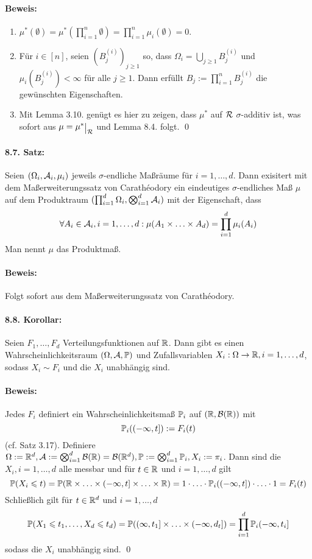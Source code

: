 \paragraph{Beweis:}
\begin{enumerate}[label=(\roman*)]
	\item $\mu^*(\emptyset)=\mu^*\left(\prod_{i=1}^n\emptyset\right)=\prod_{i=1}^n\mu_i(\emptyset)=0$.
	\item F\"ur $i\in[n]$, seien $(B_j^{(i)})_{j\geq1}$ so, dass $\Omega_i=\bigcup_{j\geq1}B_j^{(i)}$ und $\mu_i(B_j^{(i)})<\infty$ f\"ur alle $j\geq1$. Dann erf\"ullt $B_j:=\prod_{i=1}^nB_j^{(i)}$ die gew\"unschten Eigenschaften.
	\item Mit Lemma 3.10. gen\"ugt es hier zu zeigen, dass $\mu^*$ auf $\mathcal{R}$ $\sigma$-additiv ist, was sofort aus $\mu=\mu^*\krestr{\cR}$ und Lemma 8.4. folgt. \qed 
\end{enumerate}

\paragraph{8.7. Satz:}Seien $(\Omega_i,\mathcal{A}_i,\mu_i)$ jeweils $\sigma$-endliche Ma\ss{}r\"aume f\"ur $i=1,\hdots,d$. Dann exisitert mit dem Ma\ss{}erweiterungssatz von Carath\'eodory ein eindeutiges $\sigma$-endliches Ma\ss{} $\mu$ auf dem Produktraum $(\prod_{i=1}^d\Omega_i,\bigotimes_{i=1}^d\mathcal{A}_i)$ mit der Eigenschaft, dass
$$\forall A_i\in\mathcal{A}_i,i=1,\hdots,d:\mu(A_1\times\hdots\times A_d)=\prod_{i=1}^d\mu_i(A_i)$$
Man nennt $\mu$ das Produktma\ss{}.

\paragraph{Beweis:}Folgt sofort aus dem Ma\ss{}erweiterungssatz von Carath\'eodory. 

\paragraph{8.8. Korollar:}Seien $F_1,\hdots,F_d$ Verteilungsfunktionen auf $\mathbb{R}$. Dann gibt es einen Wahrscheinlichkeitsraum $(\Omega, \mathcal{A}, \mathbb{P})$ und Zufallsvariablen $X_i:\Omega\to\mathbb{R},i=1,\hdots,d$, sodass $X_i\sim F_i$ und die $X_i$ unabh\"angig sind.

\paragraph{Beweis:}Jedes $F_i$ definiert ein Wahrscheinlichkeitsma\ss{} $\mathbb{P}_i$ auf $(\mathbb{R},\mathcal{B}(\mathbb{R}))$ mit
$$\mathbb{P}_i((-\infty,t]):=F_i(t)$$
(cf. Satz 3.17). Definiere $\Omega:=\mathbb{R}^d,\mathcal{A}:=\bigotimes_{i=1}^d\mathcal{B}(\mathbb{R})=\mathcal{B}(\mathbb{R}^d),\mathbb{P}:=\bigotimes_{i=1}^d\mathbb{P}_i,X_i:=\pi_i$. Dann sind die $X_i,i=1,\hdots,d$ alle messbar und f\"ur $t\in\mathbb{R}$ und $i=1,\hdots,d$ gilt
$$\mathbb{P}(X_i\leqslant t)=\mathbb{P}(\mathbb{R}\times\hdots\times(-\infty,t]\times\hdots\times\mathbb{R})=1\cdot\hdots\cdot\mathbb{P}_i((-\infty,t])\cdot\hdots\cdot1=F_i(t)$$
Schlie\ss{}lich gilt f\"ur $t\in\mathbb{R}^d$ und $i=1,\hdots,d$
$$\mathbb{P}(X_1\leqslant t_1,\hdots,X_d\leqslant t_d)=\mathbb{P}((\infty,t_1]\times\hdots\times(-\infty,d_t])=\prod_{i=1}^d\mathbb{P}_i(-\infty,t_i]$$
sodass die $X_i$ unabh\"angig sind. \qed


